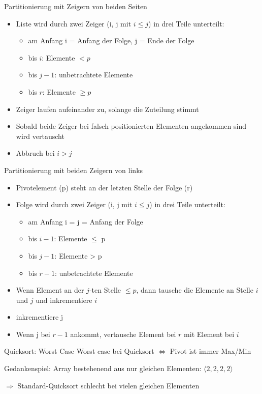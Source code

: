 \begin{frame}{Partitionierung mit Zeigern von beiden Seiten}
	\begin{itemize}
		\item Liste wird durch zwei Zeiger (i, j mit $ i \leq j $) in drei Teile unterteilt:
		\begin{itemize}
			\item am Anfang i = Anfang der Folge, j = Ende der Folge
			\item bis $i$: Elemente $< p$
			\item bis $j - 1$: unbetrachtete Elemente
			\item bis $r$: Elemente $\geq p$
		\end{itemize}
		\item Zeiger laufen aufeinander zu, solange die Zuteilung stimmt
		\item Sobald beide Zeiger bei falsch positionierten Elementen angekommen sind wird vertauscht
		\item Abbruch bei $i > j$
	\end{itemize}
\end{frame}

\begin{frame}{Partitionierung mit beiden Zeigern von links}
	\begin{itemize}
		\item Pivotelement (p) steht an der letzten Stelle der Folge (r)
		\item Folge wird durch zwei Zeiger (i, j mit $ i \leq j $) in drei Teile unterteilt:
		\begin{itemize}
			\item am Anfang i = j = Anfang der Folge
			\item bis $i - 1$: Elemente $\leq$ p
			\item bis $j - 1$: Elemente > p
			\item bis $r - 1$: unbetrachtete Elemente
		\end{itemize}
		\item Wenn Element an der $j$-ten Stelle $\leq p$, dann tausche die Elemente an Stelle $i$ und $j$ und inkrementiere $i$
		\item inkrementiere j
		\item Wenn j bei $r-1$ ankommt, vertausche Element bei $r$ mit Element bei $i$
	\end{itemize}
\end{frame}

\begin{frame} {Quicksort: Worst Case}
	Worst case bei Quicksort $\Leftrightarrow$ Pivot ist immer Max/Min

	\begin{exampleblock}{Gedankenspiel:}
		Array bestehenend aus nur gleichen Elementen: $\langle 2, 2, 2, 2 \rangle $
	\end{exampleblock}

	$\Rightarrow$ Standard-Quicksort schlecht bei vielen gleichen Elementen
\end{frame}

